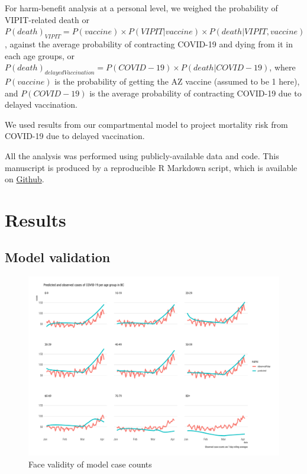 \documentclass[]{interact}
\theoremstyle{plain}%
\theoremstyle{definition}
\theoremstyle{remark}
\begin{document}
For harm-benefit analysis at a personal level, we weighed the
probability of VIPIT-related death or
\(P(death)_{VIPIT} = P(vaccine) \times P(VIPIT|vaccine) \times P(death|VIPIT, vaccine)\),
against the average probability of contracting COVID-19 and dying from
it in each age groups, or
\(P(death)_{delayedVaccination} = P(COVID-19) \times P(death|COVID-19)\),
where \(P(vaccine)\) is the probability of getting the AZ vaccine
(assumed to be 1 here), and \(P(COVID-19)\) is the average probability
of contracting COVID-19 due to delayed vaccination.

We used results from our compartmental model to project mortality risk
from COVID-19 due to delayed vaccination.

All the analysis was performed using publicly-available data and code.
This manuscript is produced by a reproducible R Markdown script, which
is available on
\href{https://github.com/aminadibi/astrazenecaVIPIT}{Github}.

\hypertarget{results}{%
\section{Results}\label{results}}

\hypertarget{model-validation}{%
\subsection{Model validation}\label{model-validation}}

\begin{figure}

{\centering \includegraphics[width=1\linewidth]{../figures/fig-validation} 

}

\caption{Face validity of model case counts}\label{fig:figValidation}
\end{figure}
\end{document}
